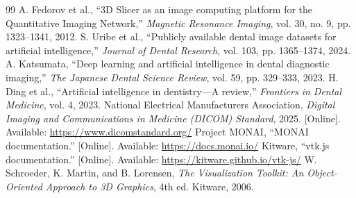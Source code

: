 \documentclass[journal]{IEEEtran}
\begin{document}
\begin{thebibliography}{99}
 A. Fedorov et al., ``3D Slicer as an image computing platform for the Quantitative Imaging Network,'' \emph{Magnetic Resonance Imaging}, vol. 30, no. 9, pp. 1323--1341, 2012.
 S. Uribe et al., ``Publicly available dental image datasets for artificial intelligence,'' \emph{Journal of Dental Research}, vol. 103, pp. 1365--1374, 2024.
 A. Katsumata, ``Deep learning and artificial intelligence in dental diagnostic imaging,'' \emph{The Japanese Dental Science Review}, vol. 59, pp. 329--333, 2023.
 H. Ding et al., ``Artificial intelligence in dentistry---A review,'' \emph{Frontiers in Dental Medicine}, vol. 4, 2023.
 National Electrical Manufacturers Association, \emph{Digital Imaging and Communications in Medicine (DICOM) Standard}, 2025. [Online]. Available: \url{https://www.dicomstandard.org/}
 Project MONAI, ``MONAI documentation.'' [Online]. Available: \url{https://docs.monai.io/}
 Kitware, ``vtk.js documentation.'' [Online]. Available: \url{https://kitware.github.io/vtk-js/}
 W. Schroeder, K. Martin, and B. Lorensen, \emph{The Visualization Toolkit: An Object-Oriented Approach to 3D Graphics}, 4th ed. Kitware, 2006.
\end{thebibliography}
\end{document}
